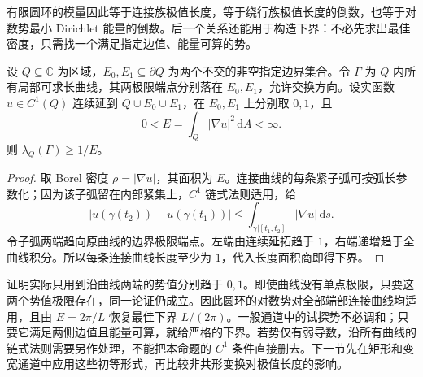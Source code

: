 \ProseParagraphBreak
有限圆环的模量因此等于连接族极值长度，等于绕行族极值长度的倒数，也等于对数势最小 Dirichlet 能量的倒数。后一个关系还能用于构造下界：不必先求出最佳密度，只需找一个满足指定边值、能量可算的势。

\begin{proposition}[试探势给极值长度下界]\label{b3:prop:08-test-potential}
设 \(Q\subseteq\mathbb C\) 为区域，\(E_0,E_1\subseteq\partial Q\) 为两个不交的非空指定边界集合。令 \(\Gamma\) 为 \(Q\) 内所有局部可求长曲线，其两极限端点分别落在 \(E_0,E_1\)，允许交换方向。设实函数 \(u\in C^1(Q)\) 连续延到 \(Q\cup E_0\cup E_1\)，在 \(E_0,E_1\) 上分别取 \(0,1\)，且
\[
 0<E=\int_Q|\nabla u|^2\,\mathrm dA<\infty.
\]
则 \(\lambda_Q(\Gamma)\ge1/E\)。
\end{proposition}
\begin{proof}
取 Borel 密度 \(\rho=|\nabla u|\)，其面积为 \(E\)。连接曲线的每条紧子弧可按弧长参数化；因为该子弧留在内部紧集上，\(C^1\) 链式法则适用，给
\[
 |u(\gamma(t_2))-u(\gamma(t_1))|
 \le\int_{\gamma|[t_1,t_2]}|\nabla u|\,\mathrm ds.
\]
令子弧两端趋向原曲线的边界极限端点。左端由连续延拓趋于 \(1\)，右端递增趋于全曲线积分。所以每条连接曲线长度至少为 \(1\)，代入长度面积商即得下界。
\end{proof}
证明实际只用到沿曲线两端的势值分别趋于 \(0,1\)。即使曲线没有单点极限，只要这两个势值极限存在，同一论证仍成立。因此圆环的对数势对全部端部连接曲线均适用，且由 \(E=2\pi/L\) 恢复最佳下界 \(L/(2\pi)\)。一般通道中的试探势不必调和；只要它满足两侧边值且能量可算，就给严格的下界。若势仅有弱导数，沿所有曲线的链式法则需要另作处理，不能把本命题的 \(C^1\) 条件直接删去。下一节先在矩形和变宽通道中应用这些初等形式，再比较非共形变换对极值长度的影响。
